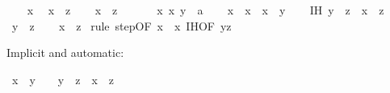 \begin{isabellebody}
\ \ \isamarkupfalse%
\ x\ \isamarkupfalse%
\ {\isachardoublequoteopen}x\ {\isasymrightarrow}{\isacharasterisk}{\kern0pt}\ z{\isachardoublequoteclose}\isanewline
\ \ \isamarkupfalse%
\ {\isachardoublequoteopen}x\ {\isasymrightarrow}{\isacharasterisk}{\kern0pt}\ z{\isachardoublequoteclose}\ \isacommand{{\isachardot}{\kern0pt}}\isamarkupfalse%
\ \isanewline
{}\isamarkupfalse%
\isanewline
\ \ \isamarkupfalse%
\ x{\isacharprime}{\kern0pt}\ x\ y\ {\isacharcolon}{\kern0pt}{\isacharcolon}{\kern0pt}\ {\isacharprime}{\kern0pt}a\isanewline
\ \ \isamarkupfalse%
\ {\isachardoublequoteopen}x{\isacharprime}{\kern0pt}\ {\isasymrightarrow}\ x{\isachardoublequoteclose}\ \ {\isachardoublequoteopen}x\ {\isasymrightarrow}{\isacharasterisk}{\kern0pt}\ y{\isachardoublequoteclose}\isanewline
\ \ \isamarkupfalse%
\ IH{\isacharcolon}{\kern0pt}\ {\isachardoublequoteopen}y\ {\isasymrightarrow}{\isacharasterisk}{\kern0pt}\ z\ {\isasymLongrightarrow}\ x\ {\isasymrightarrow}{\isacharasterisk}{\kern0pt}\ z{\isachardoublequoteclose}\isanewline
\ \ \isamarkupfalse%
\ {\isachardoublequoteopen}y\ {\isasymrightarrow}{\isacharasterisk}{\kern0pt}\ z{\isachardoublequoteclose}\isanewline
\ \ \isamarkupfalse%
\ {\isachardoublequoteopen}x{\isacharprime}{\kern0pt}\ {\isasymrightarrow}{\isacharasterisk}{\kern0pt}\ z{\isachardoublequoteclose}\ \isamarkupfalse%
{\isacharparenleft}{\kern0pt}rule\ step{\isacharbrackleft}{\kern0pt}OF\ {\isacharbackquoteopen}x{\isacharprime}{\kern0pt}\ {\isasymrightarrow}\ x{\isacharbackquoteclose}\ IH{\isacharbrackleft}{\kern0pt}OF\ {\isacharbackquoteopen}y{\isasymrightarrow}{\isacharasterisk}{\kern0pt}z{\isacharbackquoteclose}{\isacharbrackright}{\kern0pt}{\isacharbrackright}{\kern0pt}{\isacharparenright}{\kern0pt}\isanewline
{}\isamarkupfalse%
%
\endisatagproof
{\isafoldproof}%
%
\isadelimproof
%
\endisadelimproof
%
\begin{isamarkuptext}%
Implicit and automatic:%
\end{isamarkuptext}\isamarkuptrue%
\isamarkupfalse%
\ {\isachardoublequoteopen}x\ {\isasymrightarrow}{\isacharasterisk}{\kern0pt}\ y\ \ {\isasymLongrightarrow}\ \ y\ {\isasymrightarrow}{\isacharasterisk}{\kern0pt}\ z\ {\isasymLongrightarrow}\ x\ {\isasymrightarrow}{\isacharasterisk}{\kern0pt}\ z{\isachardoublequoteclose}\isanewline
%
\isadelimproof
%
\endisadelimproof
%
\isatagproof
{}\isamarkupfalse%

\end{isabellebody}
